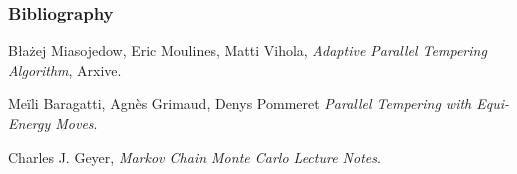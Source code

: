 \begin{frame}

	\frametitle{Bibliography}
	
	
	\begin{thebibliography}{10}

		\beamertemplatearticlebibitems

	  			Błażej Miasojedow, Eric Moulines, Matti Vihola,
	 			\emph{Adaptive Parallel Tempering Algorithm},
	  			Arxive.

				Meïli Baragatti, Agnès Grimaud, Denys Pommeret
				\emph{Parallel Tempering with Equi-Energy Moves}.  

		
		\beamertemplatebookbibitems
		
				Charles J. Geyer,
				\emph{Markov Chain Monte Carlo Lecture Notes}. 
	

	\end{thebibliography}

\end{frame}

